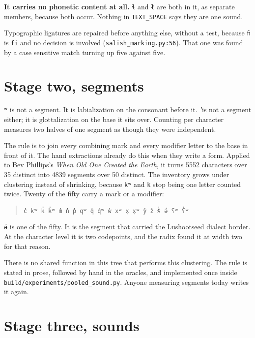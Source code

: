\textbf{It carries no phonetic content at all.} \texttt{ɬ} and \texttt{ł} are both in it, as separate
members, because both occur. Nothing in \texttt{TEXT\_\allowbreak{}SPACE} says they are one sound.

Typographic ligatures are repaired before anything else, without a test, because \texttt{ﬁ} is
\texttt{fi} and no decision is involved
(\texttt{salish\_\allowbreak{}marking.\allowbreak{}py:56}). That one was found by a case sensitive
match turning up five against ﬁve.

\section{Stage two, segments}

\texttt{ʷ} is not a segment. It is labialization on the consonant before it. \texttt{̓} is not a
segment either; it is glottalization on the base it sits over. Counting per character measures two
halves of one segment as though they were independent.

The rule is to join every combining mark and every modifier letter to the base in front of it. The
hand extractions already do this when they write a form. Applied to Bev Phillips's
\emph{When Old One Created the Earth}, it turns 5552 characters over 35 distinct into 4839 segments
over 50 distinct. The inventory grows under clustering instead of shrinking, because \texttt{kʷ} and
\texttt{k} stop being one letter counted twice. Twenty of the fifty carry a mark or a modifier:

\begin{quote}
\texttt{c̓ kʷ k̓ k̓ʷ m̓ n̓ p̓ qʷ q̓ q̓ʷ w̓ xʷ x̣ x̣ʷ y̓ z̓ ƛ̓ ə́ ʕʷ ʕ̓ʷ}
\end{quote}

\texttt{ə́} is one of the fifty. It is the segment that carried the Lushootseed dialect border. At
the character level it is two codepoints, and the radix found it at width two for that reason.

There is no shared function in this tree that performs this clustering. The rule is stated in prose,
followed by hand in the oracles, and implemented once inside
\texttt{build/\allowbreak{}experiments/\allowbreak{}pooled\_\allowbreak{}sound.\allowbreak{}py}.
Anyone measuring segments today writes it again.

\section{Stage three, sounds}

